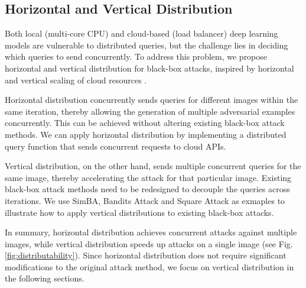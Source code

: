 
\subsection{Horizontal and Vertical Distribution}
\label{horizon_vertical}

Both local (multi-core CPU) and cloud-based (load balancer) deep learning models are vulnerable to distributed queries, but the challenge lies in deciding which queries to send concurrently. To address this problem, we propose horizontal and vertical distribution for black-box attacks, inspired by horizontal and vertical scaling of cloud resources \cite{Millnert2020}.

Horizontal distribution concurrently sends queries for different images within the same iteration, thereby allowing the generation of multiple adversarial examples concurrently. This can be achieved without altering existing black-box attack methods. We can apply horizontal distribution by implementing a distributed query function that sends concurrent requests to cloud APIs. 

Vertical distribution, on the other hand, sends multiple concurrent queries for the same image, thereby accelerating the attack for that particular image. Existing black-box attack methods need to be redesigned to decouple the queries across iterations. We use SimBA, Bandits Attack and Square Attack as exmaples to illustrate how to apply vertical distributions to existing black-box attacks.

In summary, horizontal distribution achieves concurrent attacks against multiple images, while vertical distribution speeds up attacks on a single image (see Fig. \ref{fig:distributability}). Since horizontal distribution does not require significant modifications to the original attack method, we focus on vertical distribution in the following sections. 


